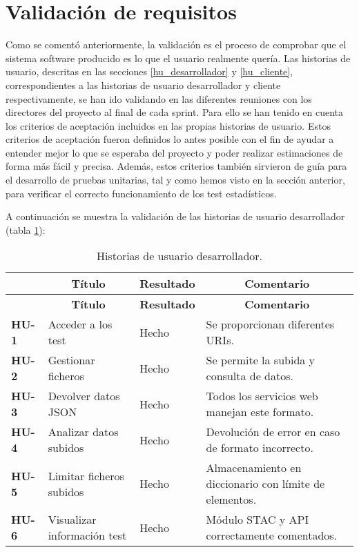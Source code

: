 \section{Validación de requisitos}

Como se comentó anteriormente, la validación es el proceso de comprobar que el sistema software producido es lo que el usuario realmente quería. Las historias de usuario, descritas en las secciones \ref{hu_desarrollador} y \ref{hu_cliente}, correspondientes a las historias de usuario desarrollador y cliente respectivamente, se han ido validando en las diferentes reuniones con los directores del proyecto al final de cada sprint. Para ello se han tenido en cuenta los criterios de aceptación incluidos en las propias historias de usuario. Estos criterios de aceptación fueron definidos lo antes posible con el fin de ayudar a entender mejor lo que se esperaba del proyecto y poder realizar estimaciones de forma más fácil y precisa. Además, estos criterios también sirvieron de guía para el desarrollo de pruebas unitarias, tal y como hemos visto en la sección anterior, para verificar el correcto funcionamiento de los test estadísticos.

A continuación se muestra la validación de las historias de usuario desarrollador (tabla \ref{validacionhud}):

\begin{center}
\setlength{\belowcaptionskip}{0.5cm}
\begin{longtable}[H]{| p{1cm} | p{4.25cm} | p{1cm} | p{5cm} |}
	\hline
	\rowcolor{Gray}
	\multicolumn{1}{|c|}{\textbf{H. Usuario}} & \multicolumn{1}{|c|}{\textbf{Título}} & \multicolumn{1}{|c|}{\textbf{Resultado}} & \multicolumn{1}{|c|}{\textbf{Comentario}} \\ \hline
	\endfirsthead
	\hline
	\rowcolor{Gray}
	\multicolumn{1}{|c|}{\textbf{H. Usuario}} & \multicolumn{1}{|c|}{\textbf{Título}} & \multicolumn{1}{|c|}{\textbf{Resultado}} & \multicolumn{1}{|c|}{\textbf{Comentario}} \\ \hline
	\endhead
	\caption{Historias de usuario desarrollador.}
	\label{validacionhud}
	\endfoot
	\textbf{HU-1} & Acceder a los test & Hecho & Se proporcionan diferentes URIs. \\ \hline
	\textbf{HU-2} & Gestionar ficheros & Hecho & Se permite la subida y consulta de datos. \\ \hline
	\textbf{HU-3} & Devolver datos JSON & Hecho & Todos los servicios web manejan este formato. \\ \hline
	\textbf{HU-4} & Analizar datos subidos & Hecho & Devolución de error en caso de formato incorrecto. \\ \hline
	\textbf{HU-5} & Limitar ficheros subidos & Hecho & Almacenamiento en diccionario con límite de elementos. \\ \hline
	\textbf{HU-6} & Visualizar información test & Hecho & Módulo STAC y API correctamente comentados.  \\ \hline
\end{longtable}
\end{center}

